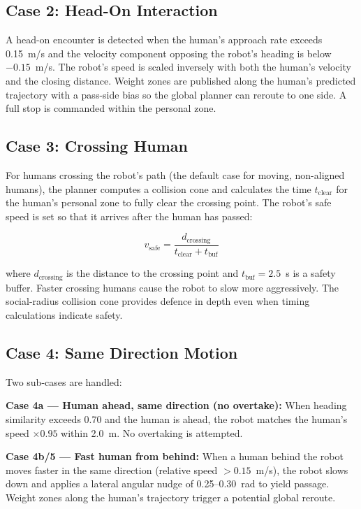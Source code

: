 \documentclass[a4paper]{article}
\begin{document}
\subsection{Case 2: Head-On Interaction}

A head-on encounter is detected when the human's approach rate exceeds 0.15~m/s and the velocity component opposing the robot's heading is below $-0.15$~m/s. The robot's speed is scaled inversely with both the human's velocity and the closing distance. Weight zones are published along the human's predicted trajectory with a pass-side bias so the global planner can reroute to one side. A full stop is commanded within the personal zone.


\subsection{Case 3: Crossing Human}

For humans crossing the robot's path (the default case for moving, non-aligned humans), the planner computes a collision cone and calculates the time $t_{\text{clear}}$ for the human's personal zone to fully clear the crossing point. The robot's safe speed is set so that it arrives after the human has passed:

\begin{equation}
    v_{\text{safe}} = \frac{d_{\text{crossing}}}{t_{\text{clear}} + t_{\text{buf}}}
\end{equation}

where $d_{\text{crossing}}$ is the distance to the crossing point and $t_{\text{buf}} = 2.5$~s is a safety buffer. Faster crossing humans cause the robot to slow more aggressively. The social-radius collision cone provides defence in depth even when timing calculations indicate safety.


\subsection{Case 4: Same Direction Motion}

Two sub-cases are handled:

\textbf{Case 4a --- Human ahead, same direction (no overtake):} When heading similarity exceeds 0.70 and the human is ahead, the robot matches the human's speed $\times 0.95$ within 2.0~m. No overtaking is attempted.

\textbf{Case 4b/5 --- Fast human from behind:} When a human behind the robot moves faster in the same direction (relative speed $> 0.15$~m/s), the robot slows down and applies a lateral angular nudge of 0.25--0.30~rad to yield passage. Weight zones along the human's trajectory trigger a potential global reroute.
\end{document}

